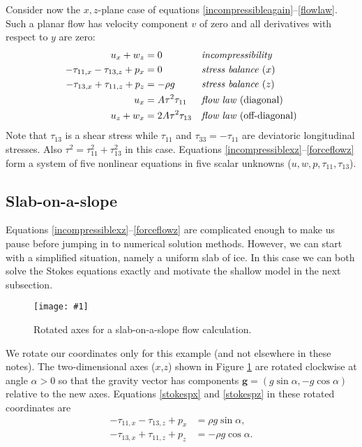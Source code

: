 \documentclass[letterpaper,final,12pt,reqno]{amsart}
\newcommand{\onefigsize}[3]{
\begin{figure}[ht]
\centering
\texttt{[image: \#1]}
\caption{#2}
\label{fig:#1}
\end{figure}}
\newcommand{\onefig}[2]{\onefigsize{#1}{#2}{3.0in}}
\begin{document}
Consider now the $x,z$-plane case of equations \eqref{incompressibleagain}--\eqref{flowlaw}.  Such a planar flow has velocity component $v$ of zero and all derivatives with respect to $y$ are zero:
\begin{align}
u_x + w_z &= 0 &&\text{\emph{incompressibility}} \label{incompressiblexz} \\
- \tau_{11,x} - \tau_{13,z} + p_x &= 0 &&\text{\emph{stress balance} ($x$)} \label{stokespx} \\
- \tau_{13,x} + \tau_{11,z} + p_z &= - \rho g &&\text{\emph{stress balance} ($z$)} \label{stokespz} \\
u_x &= A \tau^2 \tau_{11} &&\text{\emph{flow law} (diagonal)}  \label{forceflowx} \\
u_z + w _x &= 2 A \tau^2 \tau_{13} &&\text{\emph{flow law} (off-diagonal)} \label{forceflowz}
\end{align}
Note that $\tau_{13}$ is a shear stress while $\tau_{11}$ and $\tau_{33}=-\tau_{11}$ are deviatoric longitudinal stresses.  Also $\tau^2 = \tau_{11}^2+\tau_{13}^2$ in this case.  Equations \eqref{incompressiblexz}--\eqref{forceflowz} form a system of five nonlinear equations in five scalar unknowns ($u,w,p,\tau_{11},\tau_{13}$).

\subsection*{Slab-on-a-slope}  Equations \eqref{incompressiblexz}--\eqref{forceflowz} are complicated enough to make us pause before jumping in to numerical solution methods.  However, we can start with a simplified situation, namely a uniform slab of ice.  In this case we can both solve the Stokes equations exactly and motivate the shallow model in the next subsection.

\onefig{slab}{Rotated axes for a slab-on-a-slope flow calculation.}

We rotate our coordinates only for this example (and not elsewhere in these notes).  The two-dimensional axes ($x$,$z$) shown in Figure \ref{fig:slab} are rotated clockwise at angle $\alpha>0$ so that the gravity vector has components $\mathbf{g} = (g \sin\alpha,- g \cos \alpha)$ relative to the new axes.  Equations \eqref{stokespx} and \eqref{stokespz} in these rotated coordinates are
\begin{align}
- \tau_{11,x} - \tau_{13,z} + p_x &= \rho g \sin\alpha, \label{stokespxrot} \\
- \tau_{13,x} + \tau_{11,z} + p_z &= - \rho g \cos\alpha. \label{stokespzrot}
\end{align}
\end{document}
